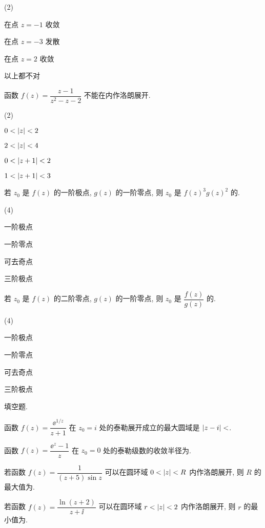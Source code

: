 \begin{homework}
\begin{homework}
      \begin{exchoice}(2)
        \item 在点 $z=-1$ 收敛
        \item 在点 $z=-3$ 发散
        \item 在点 $z=2$ 收敛
        \item 以上都不对
      \end{exchoice}
    \item 函数 $f(z)=\dfrac{z-1}{z^2-z-2}$ 不能在\fillbrace{}内作洛朗展开.
      \begin{exchoice}(2)
        \item $0<\lvert z\rvert<2$
        \item $2<\lvert z\rvert<4$
        \item $0<\lvert z+1\rvert<2$
        \item $1<\lvert z+1\rvert<3$
      \end{exchoice}
    \item 若 $z_0$ 是 $f(z)$ 的一阶极点, $g(z)$ 的一阶零点, 则 $z_0$ 是 $f(z)^3g(z)^2$ 的\fillbrace{}.
      \begin{exchoice}(4)
        \item 一阶极点
        \item 一阶零点
        \item 可去奇点
        \item 三阶极点
      \end{exchoice}
    \item 若 $z_0$ 是 $f(z)$ 的二阶零点, $g(z)$ 的一阶零点, 则 $z_0$ 是 $\dfrac{f(z)}{g(z)}$ 的\fillbrace{}.
      \begin{exchoice}(4)
        \item 一阶极点
        \item 一阶零点
        \item 可去奇点
        \item 三阶极点
      \end{exchoice}
  \end{homework}
  \item 填空题.
  \begin{homework}
    \item 函数 $f(z)=\dfrac{\ee^{1/z}}{z+1}$ 在 $z_0=i$ 处的泰勒展开成立的最大圆域是 $\lvert z-i\rvert<$\fillblank{}.
    \item 函数 $f(z)=\dfrac{\ee^z-1}{z}$ 在 $z_0=0$ 处的泰勒级数的收敛半径为\fillblank{}.
    \item 若函数 $f(z)=\dfrac1{(z+5)\sin z}$ 可以在圆环域 $0<\lvert z\rvert<R$ 内作洛朗展开, 则 $R$ 的最大值为\fillblank{}.
    \item 若函数 $f(z)=\dfrac{\ln(z+2)}{z+\ii}$ 可以在圆环域 $r<\lvert z\rvert<2$ 内作洛朗展开, 则 $r$ 的最小值为\fillblank{}.

\end{homework}
\end{homework}
